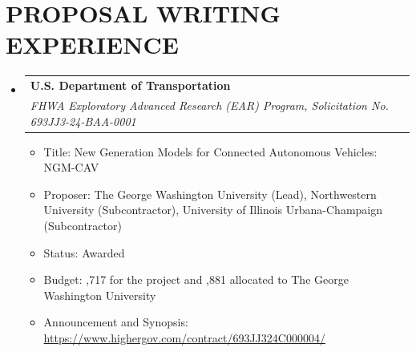 \documentclass[letterpaper,11pt]{article}
\makeatletter
\newcommand{\resumeItem}[1]{
  \item\small{
    {#1 \vspace{+3pt}}
  }
}
\newcommand{\resumeSubheading}[4]{
  \vspace{-2pt}\item
    \begin{tabular*}{1.0\textwidth}[t]{l@{\extracolsep{\fill}}r}
      \textbf{#1} & \textbf{\small #2} \\[2pt]   %
      \textit{\small#3} & \textit{\small #4} \\
    \end{tabular*}\vspace{-7pt}
}
\newcommand{\resumeSubHeadingListStart}{\begin{itemize}[leftmargin=0.0in, label={}]}
\newcommand{\resumeSubHeadingListEnd}{\end{itemize}}
\newcommand{\resumeItemListStart}{\begin{itemize}}
\newcommand{\resumeItemListEnd}{\end{itemize}\vspace{-4pt}}
\makeatother
\begin{document}
\section{PROPOSAL WRITING EXPERIENCE}
\resumeSubHeadingListStart

  \resumeSubheading
    {U.S. Department of Transportation}{}
    {FHWA Exploratory Advanced Research (EAR) Program, Solicitation No. 693JJ3-24-BAA-0001}{}
    
    \resumeItemListStart
      \resumeItem{Title: New Generation Models for Connected Autonomous Vehicles: NGM-CAV}
      \resumeItem{Proposer: The George Washington University (Lead), Northwestern University (Subcontractor), University of Illinois Urbana-Champaign (Subcontractor)}
      \resumeItem{Status: \textcolor{awarded}{Awarded}}
      \resumeItem{Budget: ,717 for the project and \textdollar344,881 allocated to The George Washington University}
      \resumeItem{Announcement and Synopsis: \href{https://www.highergov.com/contract/693JJ324C000004/}{https://www.highergov.com/contract/693JJ324C000004/}}
    \resumeItemListEnd

\resumeSubHeadingListEnd
\end{document}
